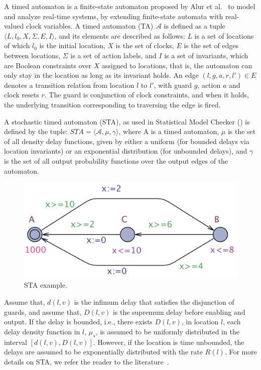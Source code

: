 A timed automaton is a finite-state automaton proposed by Alur et al.~\cite{Alur1999TimedAutomata} to model and analyze real-time systems, by extending finite-state automata with real-valued clock variables. A timed automaton (TA) $\mathcal{A}$ is defined as a tuple $\langle L,l_0,X,\Sigma,E,I\rangle$, and its elements are described as follows: $L$ is a set of locations of which $l_0$ is the initial location, $X$ is the set of clocks, $E$ is the set of edges between locations,  $\Sigma$ is a set of action labels, and $I$ is a set of invariants, which are Boolean constraints over $X$ assigned to locations, that is, the automaton can only stay in the location as long as its invariant holds. An edge $(l,g,a,r,l')\in E$ denotes a transition relation from location $l$ to $l'$, with guard $g$, action $a$ and clock resets $r$. The guard is conjunction of clock constraints, and when it holds, the underlying transition corresponding to traversing the edge is fired.


A stochastic timed automaton (STA), as used in \uppaal{} Statistical Model Checker (\uppaalsmc) is defined by the tuple: $STA =\langle\mathcal{A},\mu,\gamma\rangle$, where A is a timed automaton, $\mu$ is the set of all density delay functions, given by either a uniform (for bounded delays via location invariants) or an exponential distribution (for unbounded delays), and $\gamma$ is the set of all output probability functions over the output edges of the automaton. 
\begin{figure}
	\centering
	\includegraphics[width=0.6\linewidth]{images/sta_example}
	\caption{STA example.}
	\label{fig_staexample}
\end{figure}

Assume that, $d(l,v)$ is the infimum delay that satisfies the disjunction of guards, and assume that, $D(l,v)$ is the supremum delay before enabling and output. If the delay is bounded, i.e., there exists $D(l,v)$, in location $l$, each delay density function in $l$, $\mu_s$, is assumed to be uniformly distributed in the interval $[d(l,v),D(l,v)]$. However, if the location is time unbounded, the delays are assumed to be exponentially distributed with the rate $R(l)$. For more details on STA, we refer the reader to the literature~\cite{David2011StochasticAutomata}.

